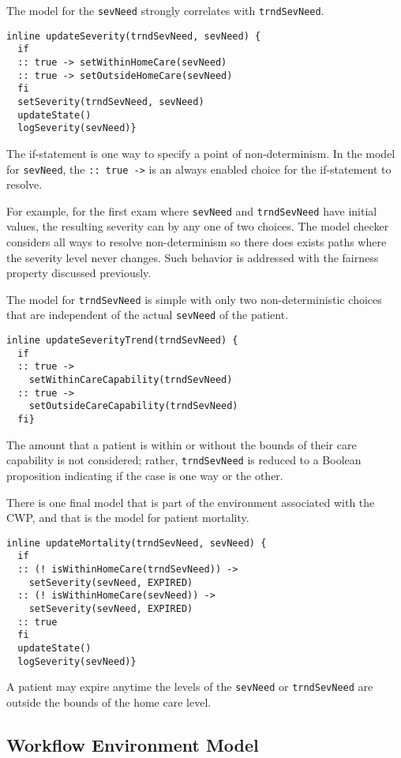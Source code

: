 The model for the \texttt{sevNeed} strongly correlates with \texttt{trndSevNeed}.
%
{\small
\begin{lstlisting}[style=myPromela]
inline updateSeverity(trndSevNeed, sevNeed) {
  if
  :: true -> setWithinHomeCare(sevNeed)
  :: true -> setOutsideHomeCare(sevNeed)
  fi 
  setSeverity(trndSevNeed, sevNeed)
  updateState()
  logSeverity(sevNeed)}
\end{lstlisting}
}
%
\noindent The if-statement is one way to specify a point of non-determinism.
In the model for \texttt{sevNeed}, the \texttt{:: true ->} is an always enabled choice for the if-statement to resolve. 

For example, for the first exam where \texttt{sevNeed} and \texttt{trndSevNeed} have initial values, the resulting severity can by any one of two choices.
The model checker considers all ways to resolve non-determinism so there does exists paths where the severity level never changes.
Such behavior is addressed with the fairness property discussed previously.

The model for \texttt{trndSevNeed} is simple with only two non-deterministic choices that are independent of the actual \texttt{sevNeed} of the patient. 
%
{\small
\begin{lstlisting}[style=myPromela]
inline updateSeverityTrend(trndSevNeed) {
  if
  :: true -> 
    setWithinCareCapability(trndSevNeed)
  :: true -> 
    setOutsideCareCapability(trndSevNeed)
  fi}
\end{lstlisting}
}
%
\noindent The amount that a patient is within or without the bounds of their care capability is not considered;
rather, \texttt{trndSevNeed} is reduced to a Boolean proposition indicating if the case is one way or the other.

There is one final model that is part of the environment associated with the CWP, and that is the model for patient mortality. 
%
{\small
\begin{lstlisting}[style=myPromela]
inline updateMortality(trndSevNeed, sevNeed) {
  if
  :: (! isWithinHomeCare(trndSevNeed)) -> 
    setSeverity(sevNeed, EXPIRED)
  :: (! isWithinHomeCare(sevNeed)) ->
    setSeverity(sevNeed, EXPIRED)
  :: true
  fi
  updateState()
  logSeverity(sevNeed)}
\end{lstlisting}
}
%
\noindent A patient may expire anytime the levels of the \texttt{sevNeed} or \texttt{trndSevNeed} are outside the bounds of the home care level.

\subsection{Workflow Environment Model}

